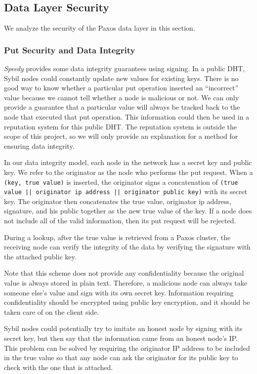 \documentclass[letter]{article}
\newcommand{\sys}{\textit{Speedy}}
\begin{document}
\subsection{Data Layer Security}

We analyze the security of the Paxos data layer in this section.

\subsubsection{Put Security and Data Integrity}
\sys{} provides some data integrity guarantees using signing. In a public DHT, Sybil nodes could constantly update
new values for existing keys. There is no good way to know whether a particular
put operation inserted an ``incorrect'' value because we cannot tell whether
a node is malicious or not. We can only provide a guarantee that a particular
value will always be tracked back to the node that executed that put operation.
This information could then be used in a reputation system for this public DHT.
The reputation system is outside the scope of this project, so we will only
provide an explanation for a method for ensuring data integrity.

In our data integrity model,
each node in the network has a secret key and public key. We refer to the originator as the node who performs the put request. When a \texttt{(key, true value)} is inserted, the originator signs a concatenation of \texttt{(true value || originator ip address || originator public key)} with its secret key.
The originator then concatenates the true value, originator ip address, signature, and his public together as the new true value of the key.
If a node does not include all of the valid information, then its put request will be rejected.

During a lookup, after the true value is retrieved from a Paxos cluster, the receiving node can verify the integrity of the data by verifying the signature with the attached public key.

Note that this scheme does not provide any confidentiality because the original value
is always stored in plain text. Therefore, a malicious node can always take someone else's value and sign with its own secret key. Information requiring confidentiality should be
encrypted using public key encryption, and it should be taken care of on the client side.

Sybil nodes could potentially try to imitate an honest node by signing with its secret key,
but then say that the information came from an honest node's IP. This problem can be solved by
requiring the originator IP address to be included in the true value so that any node can ask the originator for its public key to check with the one that is attached.
\end{document}
